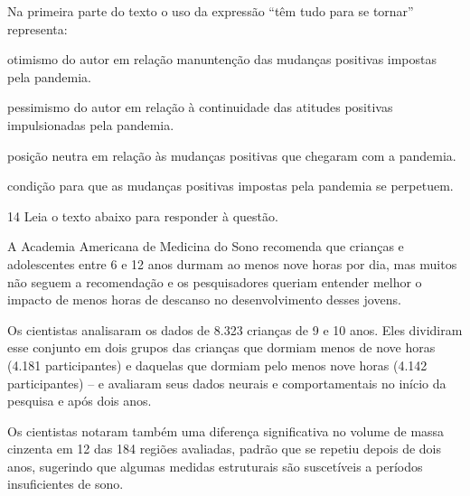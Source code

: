 
Na primeira parte do texto o uso da expressão ``têm tudo para se
tornar'' representa:

\begin{escolha}

    \item otimismo do autor em relação manuntenção das mudanças positivas
  impostas pela pandemia.

    \item pessimismo do autor em relação à continuidade das atitudes
  positivas impulsionadas pela pandemia.

    \item posição neutra em relação às mudanças positivas que chegaram com a
  pandemia.

    \item condição para que as mudanças positivas impostas pela pandemia se
  perpetuem.

\end{escolha}

\num{14} Leia o texto abaixo para responder à questão. 

\begin{myquote}

A Academia Americana de Medicina do Sono recomenda que crianças e
adolescentes entre 6 e 12 anos durmam ao menos nove horas por dia, mas
muitos não seguem a recomendação e os pesquisadores queriam entender
melhor o impacto de menos horas de descanso no desenvolvimento desses
jovens.

Os cientistas analisaram os dados de 8.323 crianças de 9 e 10 anos. Eles
dividiram esse conjunto em dois grupos das crianças que dormiam menos de
nove horas (4.181 participantes) e daquelas que dormiam pelo menos nove
horas (4.142 participantes) -- e avaliaram seus dados neurais e
comportamentais no início da pesquisa e após dois anos.

Os cientistas notaram também uma diferença significativa no volume de
massa cinzenta em 12 das 184 regiões avaliadas, padrão que se repetiu
depois de dois anos, sugerindo que algumas medidas estruturais são
suscetíveis a períodos insuficientes de sono.

\end{myquote}

